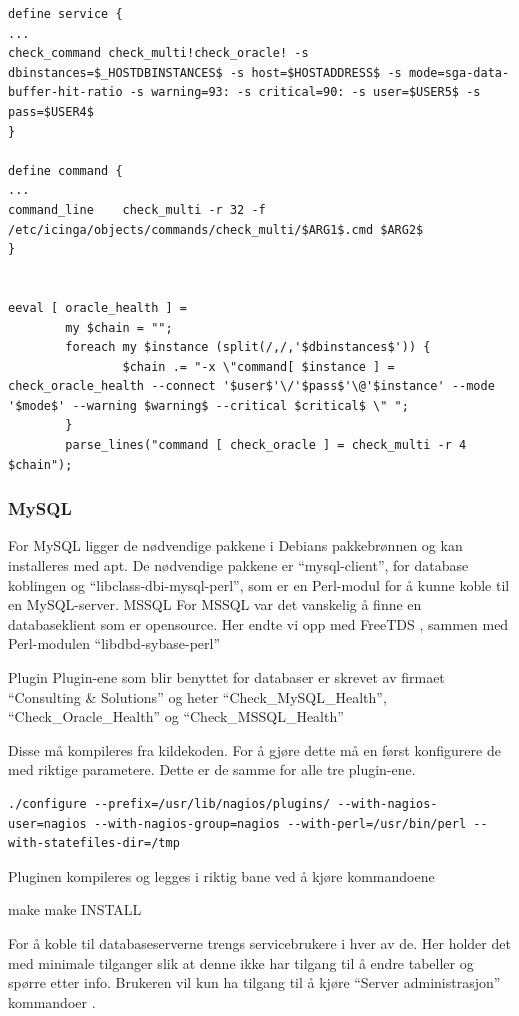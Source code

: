 \begin{lstlisting}
define service {
...
check_command check_multi!check_oracle! -s dbinstances=$_HOSTDBINSTANCES$ -s host=$HOSTADDRESS$ -s mode=sga-data-buffer-hit-ratio -s warning=93: -s critical=90: -s user=$USER5$ -s pass=$USER4$
}

define command {
...
command_line	check_multi -r 32 -f /etc/icinga/objects/commands/check_multi/$ARG1$.cmd $ARG2$
}


eeval [ oracle_health ] =
    	my $chain = "";
    	foreach my $instance (split(/,/,'$dbinstances$')) {
            	$chain .= "-x \"command[ $instance ] = check_oracle_health --connect '$user$'\/'$pass$'\@'$instance' --mode '$mode$' --warning $warning$ --critical $critical$ \" ";
    	}
    	parse_lines("command [ check_oracle ] = check_multi -r 4 $chain");

\end{lstlisting}

\subsubsection{MySQL}
For MySQL ligger de nødvendige pakkene i Debians pakkebrønnen og kan installeres med apt. De nødvendige pakkene er “mysql-client”, for database koblingen og “libclass-dbi-mysql-perl”, som er en Perl-modul for å kunne koble til en MySQL-server. 
MSSQL
For MSSQL var det vanskelig å finne en databaseklient som er opensource. Her endte vi opp med FreeTDS \cite{freetds}, sammen med Perl-modulen “libdbd-sybase-perl”

Plugin
Plugin-ene som blir benyttet for databaser er skrevet av firmaet “Consulting \& Solutions” og heter “Check\_MySQL\_Health”, “Check\_Oracle\_Health” og “Check\_MSSQL\_Health” \cite{consol}

Disse må kompileres fra kildekoden. For å gjøre dette må en først konfigurere de med riktige parametere. Dette er de samme for alle tre plugin-ene.

\begin{lstlisting}
./configure --prefix=/usr/lib/nagios/plugins/ --with-nagios-user=nagios --with-nagios-group=nagios --with-perl=/usr/bin/perl --with-statefiles-dir=/tmp
\end{lstlisting}

Pluginen kompileres og legges i riktig bane ved å kjøre kommandoene

make
make INSTALL

For å koble til databaseserverne trengs servicebrukere i hver av de. Her holder det med minimale tilganger slik at denne ikke har tilgang til å endre tabeller og spørre etter info. Brukeren vil kun ha tilgang til å kjøre “Server administrasjon” kommandoer \cite{mysqlpriv}.

